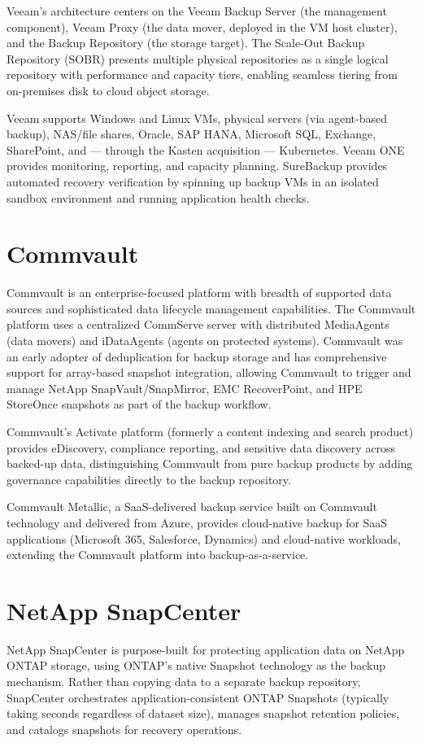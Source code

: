 Veeam's architecture centers on the Veeam Backup Server (the management component), Veeam Proxy (the data mover, deployed in the VM host cluster), and the Backup Repository (the storage target). The Scale-Out Backup Repository (SOBR) presents multiple physical repositories as a single logical repository with performance and capacity tiers, enabling seamless tiering from on-premises disk to cloud object storage.

Veeam supports Windows and Linux VMs, physical servers (via agent-based backup), NAS/file shares, Oracle, SAP HANA, Microsoft SQL, Exchange, SharePoint, and --- through the Kasten acquisition --- Kubernetes. Veeam ONE provides monitoring, reporting, and capacity planning. SureBackup provides automated recovery verification by spinning up backup VMs in an isolated sandbox environment and running application health checks.

\section{Commvault}
Commvault is an enterprise-focused platform with breadth of supported data sources and sophisticated data lifecycle management capabilities. The Commvault platform uses a centralized CommServe server with distributed MediaAgents (data movers) and iDataAgents (agents on protected systems). Commvault was an early adopter of deduplication for backup storage and has comprehensive support for array-based snapshot integration, allowing Commvault to trigger and manage NetApp SnapVault/SnapMirror, EMC RecoverPoint, and HPE StoreOnce snapshots as part of the backup workflow.

Commvault's Activate platform (formerly a content indexing and search product) provides eDiscovery, compliance reporting, and sensitive data discovery across backed-up data, distinguishing Commvault from pure backup products by adding governance capabilities directly to the backup repository.

Commvault Metallic, a SaaS-delivered backup service built on Commvault technology and delivered from Azure, provides cloud-native backup for SaaS applications (Microsoft 365, Salesforce, Dynamics) and cloud-native workloads, extending the Commvault platform into backup-as-a-service.

\section{NetApp SnapCenter}
NetApp SnapCenter is purpose-built for protecting application data on NetApp ONTAP storage, using ONTAP's native Snapshot technology as the backup mechanism. Rather than copying data to a separate backup repository, SnapCenter orchestrates application-consistent ONTAP Snapshots (typically taking seconds regardless of dataset size), manages snapshot retention policies, and catalogs snapshots for recovery operations.

